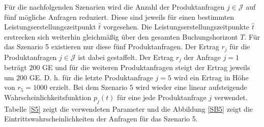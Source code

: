Für die nachfolgenden Szenarien wird die Anzahl der Produktanfragen $j\in\mathcal{J}$ auf fünf mögliche Anfragen reduziert. Diese sind jeweils für einen bestimmten Leistungserstellungszeitpunkt $\hat t$ vorgesehen. Die Leistungserstellungszeitpunkte $\hat t$ erstrecken sich weiterhin gleichmäßig über den gesamten Buchungshorizont $T$. Für das Szenario 5 existieren nur diese fünf Produktanfragen. Der Ertrag $r_j$ für die Produktanfragen $j\in\mathcal{J}$ ist dabei gestaffelt. Der Ertrag $r_j$ der Anfrage $j=1$ beträgt $200$ GE und für die weiteren Produktanfragen steigt der Ertrag jeweils um $200$ GE. D. h. für die letzte Produktanfrage $j=5$ wird ein Ertrag in Höhe von $r_5=1000$ erzielt. Bei dem Szenario 5 wird wieder eine linear aufsteigende Wahrscheinlichkeitsfunktion $p_j(t)$ für eine jede Produktanfrage $j$ verwendet. Tabelle \ref{S5} zeigt die verwendeten Parameter und die Abbildung \ref{SB5} zeigt die Eintrittswahrscheinlichkeiten der Anfragen für das Szenario 5.\\

